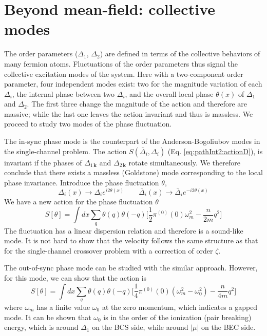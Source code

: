 \documentclass[reprint,pra]{revtex4-1}
\newcommand{\vk}{\ensuremath{\mathbf{k}}}
\newcommand{\nth}[1]{\ensuremath{\frac{1}{#1}}}
\providecommand{\abs}[1]{\ensuremath{\left\lvert{#1}\right\rvert}}
\begin{document}
\section{Beyond mean-field:  collective modes\label{sec:bosonic}}
The order parameters ($\Delta_{1}$, $\Delta_{2}$) are defined in terms of the collective behaviors of many fermion atoms.  Fluctuations of the order parameters thus signal the collective excitation modes of the system. Here with a two-component order parameter, four independent modes exist:   two for the magnitude variation of each $\Delta_i$, the internal phase between two $\Delta_i$, and the overall local phase $\theta(x)$ of $\Delta_1$ and $\Delta_2$.  The first three change the magnitude of the action and therefore are massive; while the last one leaves the action invariant and thus is massless. 
We proceed to study two modes of the phase fluctuation.  

The in-sync phase mode is the counterpart of the Anderson-Bogoliubov modes in the single-channel problem. The action $S(\bar{\Delta}_i,\Delta_i)$ (Eq. \ref{eq:pathInt2:actionD}), is invariant if the phases of $\Delta_{1\,\vk}$ and $\Delta_{2\,\vk}$ rotate simultaneously. We therefore conclude that there exists a massless (Goldstone) mode corresponding to the local phase invariance.  Introduce the phase fluctuation $\theta$, 
\begin{equation*}
\Delta_{i}(x)\rightarrow{}\Delta_{i}e^{i2\theta(x)}\qquad{}
\bar{\Delta}_{i}(x)\rightarrow{}\bar{\Delta}_{i}e^{-i2\theta(x)}
\end{equation*}
We have a new action for the phase fluctuation $\theta$
\begin{equation}
S[\theta]=\int{dx}\sum_{q}\theta(q)\theta(-q)\big[\nth{2}\pi^{(0)}(0)\omega_m^2-\frac{n}{2m}q^2\big]
\end{equation}
The fluctuation has a linear dispersion relation and therefore is a sound-like mode.    It is not hard to show that the velocity follows the same structure as that for the single-channel crossover problem \cite{RanderiaBEC} with a correction of order  $\zeta$.

The out-of-sync phase mode can be studied with the similar approach. However, for this mode, we can show that the action is 
\begin{equation}\label{eq:pathInt2:outofphase}
S[\theta]=\int{dx}\sum_{q}\theta(q)\theta(-q)\big[\nth{4}\pi^{(0)}(0)(\omega_m^2-\omega_{0}^{2})-\frac{n}{4m}q^2\big]
\end{equation}
where $\omega_{m}$ has a finite value $\omega_{0}$ at the zero momentum, which indicates a gapped mode. It can be shown that $\omega_{0}$
 is in the order of the ionization (pair breaking) energy, which is around $\Delta_1$ on the BCS side, while around $\abs{\mu}$ on the BEC side. 
\end{document}
